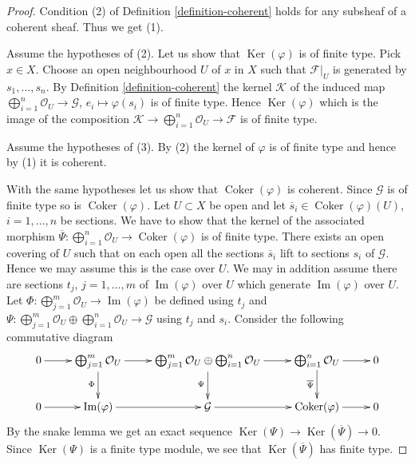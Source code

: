 \documentclass{stacks-project}
\theoremstyle{plain}
\theoremstyle{definition}
\theoremstyle{remark}
\numberwithin{equation}{subsection}
\def\Ker{\mathop{\mathrm{Ker}}}
\def\Im{\mathop{\mathrm{Im}}}
\def\Coker{\mathop{\mathrm{Coker}}}
\begin{document}
\begin{proof}
Condition (2) of Definition \ref{definition-coherent}
holds for any subsheaf of a coherent sheaf. Thus we get (1).

\medskip\noindent
Assume the hypotheses of (2).
Let us show that $\Ker(\varphi)$ is of finite type. Pick $x \in X$.
Choose an open neighbourhood $U$ of $x$ in $X$ such
that $\mathcal{F}|_U$ is generated by $s_1, \ldots, s_n$.
By Definition \ref{definition-coherent} the kernel $\mathcal{K}$
of the induced map
$\bigoplus_{i = 1}^n \mathcal{O}_U \to \mathcal{G}$,
$e_i \mapsto \varphi(s_i)$ is of finite type.
Hence $\Ker(\varphi)$ which is the image of the
composition
$\mathcal{K} \to \bigoplus_{i = 1}^n \mathcal{O}_U \to \mathcal{F}$
is of finite type.

\medskip\noindent
Assume the hypotheses of (3).
By (2) the kernel of $\varphi$ is of finite type and
hence by (1) it is coherent.

\medskip\noindent
With the same hypotheses let us show that $\Coker(\varphi)$ is coherent.
Since $\mathcal{G}$ is of finite type so is $\Coker(\varphi)$.
Let $U \subset X$ be open and let $\overline{s}_i \in \Coker(\varphi)(U)$,
$i = 1, \ldots, n$ be sections. We have to show that the kernel of the
associated morphism
$\overline{\Psi} : \bigoplus_{i = 1}^n \mathcal{O}_U \to \Coker(\varphi)$
is of finite type. There exists an open covering
of $U$ such that on each open all the sections $\overline{s}_i$
lift to sections $s_i$ of $\mathcal{G}$. Hence we may assume
this is the case over $U$. We may in addition assume there are
sections $t_j$, $j = 1, \ldots, m$ of $\Im(\varphi)$ over $U$
which generate $\Im(\varphi)$ over $U$.
Let $\Phi : \bigoplus_{j = 1}^m \mathcal{O}_U \to \Im(\varphi)$
be defined using $t_j$ and
$\Psi :
\bigoplus_{j = 1}^m \mathcal{O}_U \oplus
\bigoplus_{i = 1}^n \mathcal{O}_U \to \mathcal{G}$
using $t_j$ and $s_i$.
Consider the following commutative diagram
$$
\xymatrix{
0 \ar[r] &
\bigoplus_{j = 1}^m \mathcal{O}_U \ar[d]_\Phi \ar[r] &
\bigoplus_{j = 1}^m \mathcal{O}_U \oplus
\bigoplus_{i = 1}^n \mathcal{O}_U \ar[d]_\Psi \ar[r] &
\bigoplus_{i = 1}^n \mathcal{O}_U \ar[d]_{\overline{\Psi}} \ar[r] &
0 \\
0 \ar[r] &
\Im(\varphi) \ar[r] &
\mathcal{G} \ar[r] &
\Coker(\varphi) \ar[r] &
0
}
$$
By the snake lemma we get an exact sequence
$\Ker(\Psi) \to \Ker(\overline{\Psi}) \to 0$. Since $\Ker(\Psi)$
is a finite type module, we see that $\Ker(\overline{\Psi})$ has finite type.


\end{proof}
\end{document}
